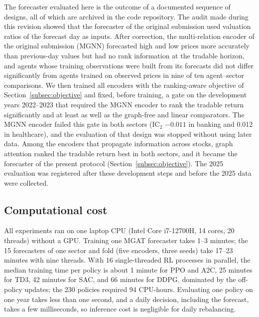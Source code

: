 \documentclass[pdflatex,sn-mathphys-num]{sn-jnl}%
\theoremstyle{thmstyleone}%
\theoremstyle{thmstyletwo}%
\theoremstyle{thmstylethree}%
\begin{document}
{\color{blue}The forecaster evaluated here is the outcome of a documented sequence of designs, all of which are archived in the code repository. The audit made during this revision showed that the forecaster of the original submission used valuation ratios of the forecast day as inputs. After correction, the multi-relation encoder of the original submission (MGNN) forecasted high and low prices more accurately than previous-day values but had no rank information at the tradable horizon, and agents whose training observations were built from its forecasts did not differ significantly from agents trained on observed prices in nine of ten agent--sector comparisons. We then trained all encoders with the ranking-aware objective of Section~\ref{subsec:objective} and fixed, before training, a gate on the development years 2022--2023 that required the MGNN encoder to rank the tradable return significantly and at least as well as the graph-free and linear comparators. The MGNN encoder failed this gate in both sectors (IC$_2$ $-0.011$ in banking and 0.012 in healthcare), and the evaluation of that design was stopped without using later data. Among the encoders that propagate information across stocks, graph attention ranked the tradable return best in both sectors, and it became the forecaster of the present protocol (Section~\ref{subsec:objective}). The 2025 evaluation was registered after these development steps and before the 2025 data were collected.\par}

\subsection{Computational cost}\label{subsec:compute}

{\color{blue}All experiments ran on one laptop CPU (Intel Core i7-12700H, 14 cores, 20 threads) without a GPU. Training one MGAT forecaster takes 1--3 minutes; the 15 forecasters of one sector and fold (five encoders, three seeds) take 17--23 minutes with nine threads. With 16 single-threaded RL processes in parallel, the median training time per policy is about 1 minute for PPO and A2C, 25 minutes for TD3, 42 minutes for SAC, and 66 minutes for DDPG, dominated by the off-policy updates; the 230 policies required 94 CPU-hours. Evaluating one policy on one year takes less than one second, and a daily decision, including the forecast, takes a few milliseconds, so inference cost is negligible for daily rebalancing.\par}
\end{document}
